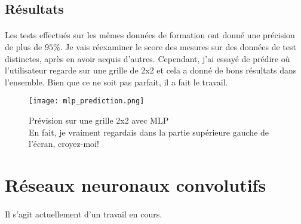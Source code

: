 \subsection{Résultats}
\paragraph{}
Les tests effectués sur les mêmes données de formation ont donné une précision de plus de $95\%$.
Je vais réexaminer le score des mesures sur des données de test distinctes, après en avoir acquis d'autres.
Cependant, j'ai essayé de prédire où l'utilisateur regarde sur une grille de 2x2 et cela a donné de bons résultats dans l'ensemble.
Bien que ce ne soit pas parfait, il a fait le travail.

\begin{figure}[h]
    \centering
    \texttt{[image: mlp\_prediction.png]}
    \caption{Prévision sur une grille 2x2 avec MLP\\En fait, je vraiment regardais dans la partie supérieure gauche de l'écran, croyez-moi!}
    \label{}
\end{figure}

\section{Réseaux neuronaux convolutifs}
\paragraph{}
Il s'agit actuellement d'un travail en cours.

